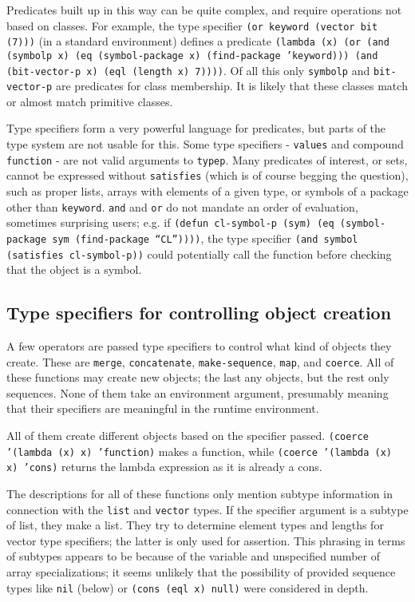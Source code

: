 \documentclass{article}
\begin{document}
Predicates built up in this way can be quite complex, and require operations not based on classes. For example, the type specifier \texttt{(or keyword (vector bit (7)))} (in a standard environment) defines a predicate \texttt{(lambda (x) (or (and (symbolp x) (eq (symbol-package x) (find-package 'keyword))) (and (bit-vector-p x) (eql (length x) 7))))}. Of all this only \texttt{symbolp} and \texttt{bit-vector-p} are predicates for class membership. It is likely that these classes match or almost match primitive classes.

Type specifiers form a very powerful language for predicates, but parts of the type system are not usable for this. Some type specifiers - \texttt{values} and compound \texttt{function} - are not valid arguments to \texttt{typep}. Many predicates of interest, or sets, cannot be expressed without \texttt{satisfies} (which is of course begging the question), such as proper lists, arrays with elements of a given type, or symbols of a package other than \texttt{keyword}. \texttt{and} and \texttt{or} do not mandate an order of evaluation, sometimes surprising users; e.g. if \texttt{(defun cl-symbol-p (sym) (eq (symbol-package sym (find-package ``CL''))))}, the type specifier \texttt{(and symbol (satisfies cl-symbol-p))} could potentially call the function before checking that the object is a symbol.


\subsection{Type specifiers for controlling object creation}

A few operators are passed type specifiers to control what kind of objects they create. These are \texttt{merge}, \texttt{concatenate}, \texttt{make-sequence}, \texttt{map}, and \texttt{coerce}. All of these functions may create new objects; the last any objects, but the rest only sequences. None of them take an environment argument, presumably meaning that their specifiers are meaningful in the runtime environment.

All of them create different objects based on the specifier passed. \texttt{(coerce '(lambda (x) x) 'function)} makes a function, while \texttt{(coerce '(lambda (x) x) 'cons)} returns the lambda expression as it is already a cons.

The descriptions for all of these functions only mention subtype information in connection with the \texttt{list} and \texttt{vector} types. If the specifier argument is a subtype of list, they make a list. They try to determine element types and lengths for vector type specifiers; the latter is only used for assertion. This phrasing in terms of subtypes appears to be because of the variable and unspecified number of array specializations; it seems unlikely that the possibility of provided sequence types like \texttt{nil} (below) or \texttt{(cons (eql x) null)} were considered in depth.
\end{document}
